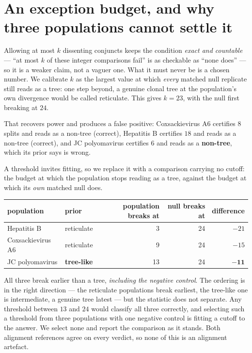 \documentclass[11pt,a4paper]{article}
\theoremstyle{definition}
\theoremstyle{remark}
\begin{document}
\section{An exception budget, and why three populations cannot settle it}
\label{sec:three}

Allowing at most $k$ dissenting conjuncts keeps the condition \emph{exact and
countable} --- ``at most $k$ of these integer comparisons fail'' is as checkable
as ``none does'' --- so it is a weaker claim, not a vaguer one. What it must never
be is a chosen number. We calibrate $k$ as the largest value at which
\emph{every} matched null replicate still reads as a tree: one step beyond, a
genuine clonal tree at the population's own divergence would be called
reticulate. This gives $k = 23$, with the null first breaking at $24$.

That recovers power and produces a false positive: Coxsackievirus A6 certifies
$8$ splits and reads as a non-tree (correct), Hepatitis B certifies $18$ and
reads as a non-tree (correct), and JC polyomavirus certifies $6$ and reads as a
\textbf{non-tree}, which its prior says is wrong.

A threshold invites fitting, so we replace it with a comparison carrying no
cutoff: the budget at which the population stops reading as a tree, against the
budget at which its \emph{own} matched null does.

\begin{center}\footnotesize
\begin{tabular}{@{}llrrr@{}}
\toprule
population & prior & population breaks at & null breaks at & difference \\
\midrule
Hepatitis B & reticulate & 3 & 24 & $-21$ \\
Coxsackievirus A6 & reticulate & 9 & 24 & $-15$ \\
JC polyomavirus & \textbf{tree-like} & 13 & 24 & $\mathbf{-11}$ \\
\bottomrule
\end{tabular}
\end{center}

All three break earlier than a tree, \emph{including the negative control}. The
ordering is in the right direction --- the reticulate populations break earliest,
the tree-like one is intermediate, a genuine tree latest --- but the statistic
does not separate. Any threshold between $13$ and $24$ would classify all three
correctly, and selecting such a threshold from three populations with one
negative control is fitting a cutoff to the answer. We select none and report the
comparison as it stands. Both alignment references agree on every verdict, so
none of this is an alignment artefact.
\end{document}
